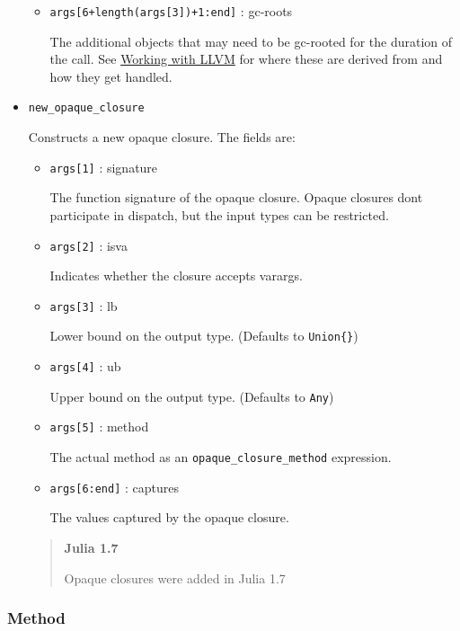 \begin{itemize}
\begin{itemize}
\item \texttt{args[6+length(args[3])+1:end]} : gc-roots

The additional objects that may need to be gc-rooted for the duration of the call. See \hyperlink{16487312531471662451}{Working with LLVM} for where these are derived from and how they get handled.

\end{itemize}

\item \texttt{new\_opaque\_closure}

Constructs a new opaque closure. The fields are:

\begin{itemize}
\item \texttt{args[1]} : signature

The function signature of the opaque closure. Opaque closures don{\textquotesingle}t participate in dispatch, but the input types can be restricted.


\item \texttt{args[2]} : isva

Indicates whether the closure accepts varargs.


\item \texttt{args[3]} : lb

Lower bound on the output type. (Defaults to \texttt{Union\{\}})


\item \texttt{args[4]} : ub

Upper bound on the output type. (Defaults to \texttt{Any})


\item \texttt{args[5]} : method

The actual method as an \texttt{opaque\_closure\_method} expression.


\item \texttt{args[6:end]} : captures

The values captured by the opaque closure.

\end{itemize}
\begin{quote}
\textbf{Julia 1.7}

Opaque closures were added in Julia 1.7

\end{quote}
\end{itemize}


\hypertarget{10862348325946528961}{}


\subsubsection{Method}



